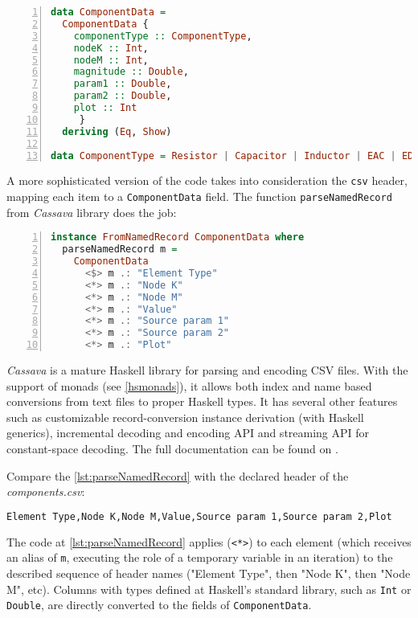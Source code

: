\begin{lstlisting}[language=Haskell, numbers=left, caption={ComponentData and ComponentType declarations}, captionpos=b, label={lst:csv2}]
data ComponentData = 
  ComponentData { 
    componentType :: ComponentType,
    nodeK :: Int,
    nodeM :: Int,
    magnitude :: Double,
    param1 :: Double,
    param2 :: Double,
    plot :: Int
     }
  deriving (Eq, Show)

data ComponentType = Resistor | Capacitor | Inductor | EAC | EDC | Other Text deriving (Eq, Show)

\end{lstlisting}

A more sophisticated version of the code takes into consideration the \lstinline!csv! header, mapping each item to a \lstinline!ComponentData! field. The function \lstinline!parseNamedRecord! from \textit{Cassava} library does the job:


\begin{lstlisting}[language=Haskell, numbers=left, caption={parseNamedRecord}, captionpos=b, label={lst:parseNamedRecord}]
instance FromNamedRecord ComponentData where
  parseNamedRecord m =
    ComponentData
      <$> m .: "Element Type"
      <*> m .: "Node K"
      <*> m .: "Node M"
      <*> m .: "Value"
      <*> m .: "Source param 1"
      <*> m .: "Source param 2"
      <*> m .: "Plot"
\end{lstlisting}

\textit{Cassava} is a mature Haskell library for parsing and encoding CSV files. With the support of monads (see \cref{hsmonads}), it allows both index and name based conversions from text files to proper Haskell types. It has several other features such as customizable record-conversion instance derivation (with Haskell generics), incremental decoding and encoding API and streaming API for constant-space decoding. The full documentation can be found on \cite{cassava}.

Compare the \cref{lst:parseNamedRecord} with the declared header of the \textit{components.csv}:

\begin{lstlisting}[language=bash, caption={CAV header components file}, captionpos=b]
Element Type,Node K,Node M,Value,Source param 1,Source param 2,Plot
\end{lstlisting}

The code at \cref{lst:parseNamedRecord} applies (\lstinline!<*>!) to each element (which receives an alias of \lstinline!m!, executing the role of a temporary variable in an iteration) to the described sequence of header names ("Element Type", then "Node K", then "Node M", etc). Columns with types defined at Haskell's standard library, such as \lstinline!Int! or \lstinline!Double!, are directly converted to the fields of \lstinline!ComponentData!.

